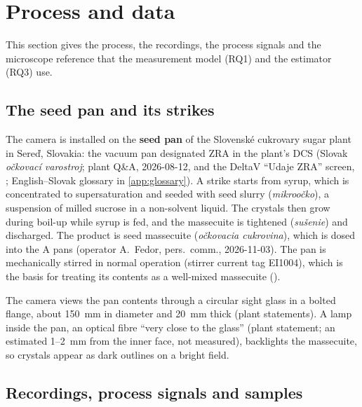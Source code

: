 \section{Process and data}\label{sec:process}

This section gives the process, the recordings, the process signals and the microscope reference that the
measurement model (RQ1) and the estimator (RQ3) use.

\subsection{The seed pan and its strikes}\label{sec:plant}

The camera is installed on the \textbf{seed pan} of the Slovensk\'e cukrovary sugar plant in Sere\v{d}, Slovakia: the
vacuum pan designated ZRA in the plant's DCS (Slovak \emph{o\v{c}kovac\'i varostroj}; plant Q\&A, 2026-08-12, and the
DeltaV ``Udaje ZRA'' screen, \citealp{SlovenskeCukrovary2026}; English--Slovak glossary in
\ref{app:glossary}). A strike starts from syrup, which is concentrated to supersaturation and seeded with seed
slurry (\emph{mikroo\v{c}ko}), a suspension of milled sucrose in a non-solvent liquid. The crystals then grow during
boil-up while syrup is fed, and the massecuite is tightened (\emph{su\v{s}enie}) and discharged. The product is seed
massecuite (\emph{o\v{c}kovacia cukrovina}), which is dosed into the A pans (operator A.~Fedor, pers.\ comm.,
2026-11-03). The pan is mechanically stirred in normal operation (stirrer current tag EI1004), which is the basis
for treating its contents as a well-mixed massecuite ().

The camera views the pan contents through a circular sight glass in a bolted flange, about 150~mm in diameter and
20~mm thick (plant statements). A lamp inside the pan, an optical fibre ``very close to the glass'' (plant statement;
an estimated 1--2~mm from the inner face, not measured), backlights the massecuite, so crystals appear as dark
outlines on a bright field.

\subsection{Recordings, process signals and samples}\label{sec:data}

